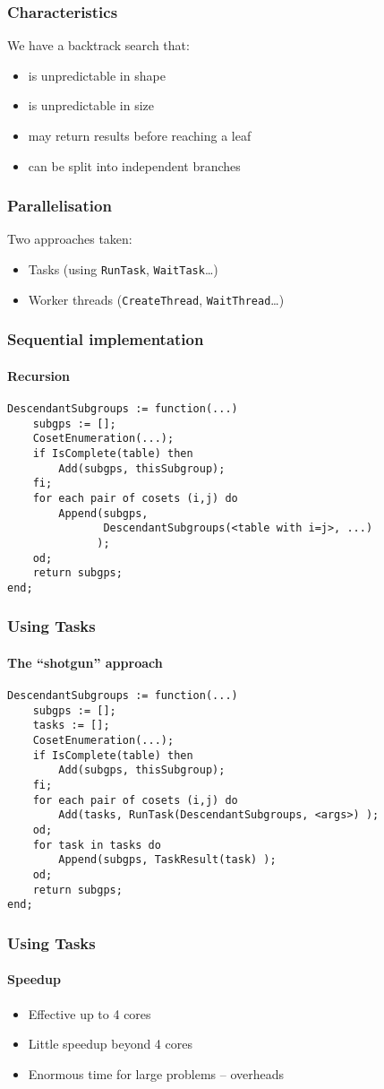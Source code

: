 \documentclass{beamer}
\begin{document}
\begin{frame}
  \frametitle{Characteristics}
  We have a backtrack search that: \pause
  \begin{itemize}
  \item is unpredictable in shape \pause
  \item is unpredictable in size \pause
  \item may return results before reaching a leaf \pause
  \item can be split into independent branches
  \end{itemize}
\end{frame}

\begin{frame}
  \frametitle{Parallelisation}
  Two approaches taken:
  \begin{itemize}
  \item Tasks (using \texttt{RunTask}, \texttt{WaitTask}\dots)
  \item Worker threads (\texttt{CreateThread}, \texttt{WaitThread}\dots)
  \end{itemize}
\end{frame}

\begin{frame}[fragile]
  \frametitle{Sequential implementation}
  \framesubtitle{Recursion}
\begin{verbatim}
DescendantSubgroups := function(...)
    subgps := [];
    CosetEnumeration(...);
    if IsComplete(table) then
        Add(subgps, thisSubgroup);
    fi;
    for each pair of cosets (i,j) do
        Append(subgps,
               DescendantSubgroups(<table with i=j>, ...)
              );
    od;
    return subgps;
end;
\end{verbatim}
\end{frame}

\begin{frame}[fragile]
  \frametitle{Using Tasks}
  \framesubtitle{The ``shotgun'' approach}
\begin{verbatim}
DescendantSubgroups := function(...)
    subgps := [];
    tasks := [];
    CosetEnumeration(...);
    if IsComplete(table) then
        Add(subgps, thisSubgroup);
    fi;
    for each pair of cosets (i,j) do
        Add(tasks, RunTask(DescendantSubgroups, <args>) );
    od;
    for task in tasks do
        Append(subgps, TaskResult(task) );
    od;
    return subgps;
end;
\end{verbatim}
\end{frame}

\begin{frame}
  \frametitle{Using Tasks}
  \framesubtitle{Speedup}
  \begin{itemize}
  \item Effective up to 4 cores \pause
  \item Little speedup beyond 4 cores \pause
  \item Enormous time for large problems -- overheads
  \end{itemize}
\end{frame}
\end{document}
